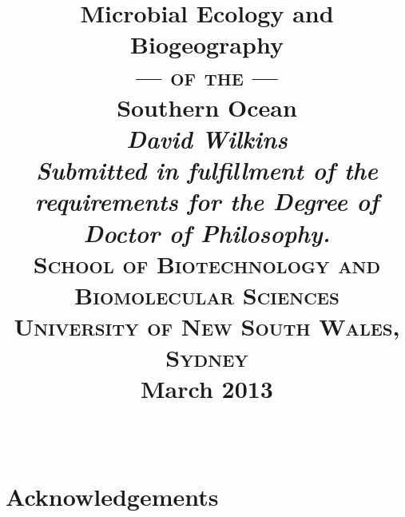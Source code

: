 \documentclass[a4paper]{book}
\begin{document}
\date{}
\title{
  \bigskip
  \Huge{Microbial Ecology and Biogeography}\\ \medskip \vspace{1 mm} \smallskip \smallskip \Large{\textsc{--- of the ---}}\\ \medskip \Huge{Southern Ocean}\\
  \bigskip
  \bigskip
  \bigskip
  \bigskip
  \bigskip
  \bigskip
  \bigskip
  \bigskip
  \huge{\textit{David Wilkins}}
  \vfill
  \small{
    \large{\adfdoubleflourishright}\\
    \smallskip
    \textit{Submitted in fulfillment of the requirements for the Degree of Doctor of Philosophy.}\\
    \medskip
    \textsc{School of Biotechnology and Biomolecular Sciences\\
    University of New South Wales, Sydney}\\
    \medskip
    \large{\textbf{March 2013}}\\
    \smallskip
    \large{\adfdoubleflourishright}\\
  }
  \medskip
}

\maketitle






\tableofcontents

\listoffigures
{}

\listoftables
{}

\singlespacing
\printglossary[type=\acronymtype]

\chapter{Acknowledgements}

\clearpage
{}

\glsresetall


\glsresetall


\glsresetall


\glsresetall


\singlespacing
{}



\glsresetall
\setcounter{secnumdepth}{1}
\begin{appendices}
  
  
\end{appendices}
\end{document}
